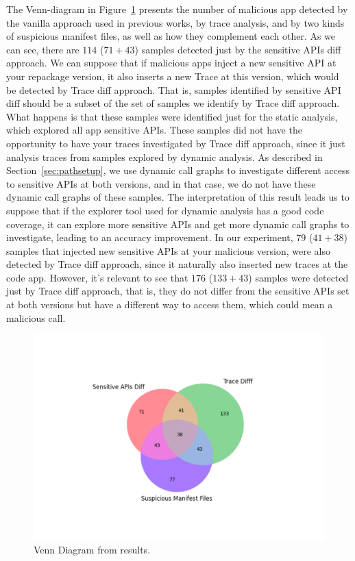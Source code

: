 The Venn-diagram in Figure~\ref{fig:vennDiagram} presents the number of malicious app detected by the vanilla approach used in previous works, by trace analysis, and by two kinds of suspicious manifest files, as well as how they complement each other. As we can see, there are $114$ ($71+43$) samples detected just by the sensitive APIs diff approach. We can suppose that if malicious apps inject a new sensitive API at your repackage version, it also inserts a new Trace at this version, which would be detected by Trace diff approach. That is, samples identified by sensitive API diff should be a subset of the set of samples we identify by Trace diff approach. What happens is that these samples were identified just for the static analysis, which explored all app sensitive APIs. These samples did not have the opportunity to have your traces investigated by Trace diff approach, since it just analysis traces from samples explored by dynamic analysis. As described in Section~\ref{sec:pathsetup}, we use dynamic call graphs to investigate different access to sensitive APIs at both versions, and in that case, we do not have these dynamic call graphs of these samples. The interpretation of this result leads us to suppose that if the explorer tool used for dynamic analysis has a good code coverage, it can explore more sensitive APIs and get more dynamic call graphs to investigate, leading to an accuracy improvement. In our experiment, $79$ ($41+38$) samples that injected new sensitive APIs at your malicious version, were also detected by Trace diff approach, since it naturally also inserted new traces at the code app. However, it's relevant to see that $176$ ($133+43$) samples were detected just by Trace diff approach, that is, they do not differ from the sensitive APIs set at both versions but have a different way to access them, which could mean a malicious call.


\begin{figure}[ht]
\centering
\includegraphics[scale=0.40]{images/vennDiagram.pdf}
\caption{Venn Diagram from results.}
 \label{fig:vennDiagram}
\end{figure}


